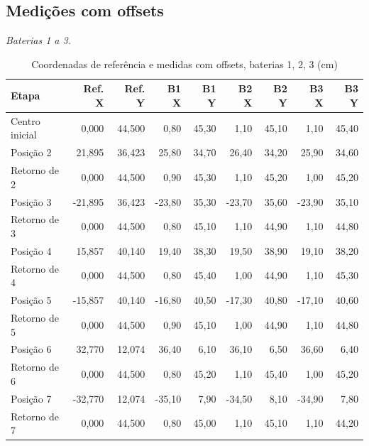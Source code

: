 \subsection{Medições com offsets}
\noindent\textit{Baterias 1 a 3.}
\begin{table}[H]\centering
\caption{Coordenadas de referência e medidas com offsets, baterias 1, 2, 3 (cm)}
\label{tab:coordenadas-com-123}
\scriptsize\setlength{\tabcolsep}{2.4pt}
\begin{tabular}{lrrrrrrrr}\toprule
Etapa & Ref. X & Ref. Y & B1 X & B1 Y & B2 X & B2 Y & B3 X & B3 Y \\
\midrule
Centro inicial & 0,000 & 44,500 & 0,80 & 45,30 & 1,10 & 45,10 & 1,10 & 45,40\\
Posição 2 & 21,895 & 36,423 & 25,80 & 34,70 & 26,40 & 34,20 & 25,90 & 34,60\\
Retorno de 2 & 0,000 & 44,500 & 0,90 & 45,30 & 1,10 & 45,20 & 1,00 & 45,20\\
Posição 3 & -21,895 & 36,423 & -23,80 & 35,30 & -23,70 & 35,60 & -23,90 & 35,10\\
Retorno de 3 & 0,000 & 44,500 & 0,80 & 45,10 & 1,10 & 44,90 & 1,10 & 44,80\\
Posição 4 & 15,857 & 40,140 & 19,40 & 38,30 & 19,50 & 38,90 & 19,10 & 38,20\\
Retorno de 4 & 0,000 & 44,500 & 0,80 & 45,40 & 1,00 & 44,90 & 1,10 & 45,30\\
Posição 5 & -15,857 & 40,140 & -16,80 & 40,50 & -17,30 & 40,80 & -17,10 & 40,60\\
Retorno de 5 & 0,000 & 44,500 & 0,90 & 45,10 & 1,00 & 44,90 & 1,10 & 44,80\\
Posição 6 & 32,770 & 12,074 & 36,40 & 6,10 & 36,10 & 6,50 & 36,60 & 6,40\\
Retorno de 6 & 0,000 & 44,500 & 0,80 & 45,20 & 1,10 & 45,40 & 1,00 & 45,20\\
Posição 7 & -32,770 & 12,074 & -35,10 & 7,90 & -34,50 & 8,10 & -34,90 & 7,80\\
Retorno de 7 & 0,000 & 44,500 & 0,80 & 45,00 & 1,10 & 45,10 & 1,10 & 44,20\\
\bottomrule\end{tabular}
\par{}
\end{table}
